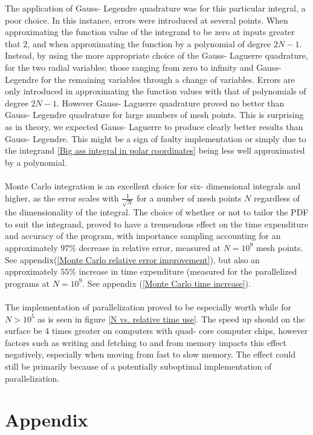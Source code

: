 \documentclass[10pt,a4paper]{article}
\begin{document}
The application of Gauss- Legendre quadrature was for this particular integral, a poor choice. In this instance, errors were introduced at several points. When approximating the function value of the integrand to be zero at inputs greater that 2, and when approximating the function by a polynomial of degree $2N-1$.\\Instead, by using the more appropriate choice of the Gauss- Laguerre quadrature, for the two radial variables; those ranging from zero to infinity and Gauss- Legendre for the remaining variables through a change of variables. Errors are only introduced in approximating the function values with that of polynomials of degree $2N-1$. However Gauss- Laguerre quadrature proved no better than Gauss- Legendre quadrature for large numbers of mesh points. This is surprising as in theory, we expected Gauss- Laguerre to produce clearly better results than Gauss- Legendre. This might be a sign of faulty implementation or simply due to the integrand \ref{Big ass integral in polar coordinates} being less well approximated by a polynomial.\\\\Monte Carlo integration is an excellent choice for six- dimensional integrals and higher, as the error scales with $\frac{1}{\sqrt{N}}$ for a number of mesh points $N$ regardless of the dimensionality of the integral. The choice of whether or not to tailor the PDF to suit the integrand, proved to have a tremendous effect on the time expenditure and accuracy of the program, with importance sampling accounting for an approximately  $97\%$ decrease in relative error, measured at $N = 10^9$ mesh points. See appendix(\ref{Monte Carlo relative error improvement}), but also an approximately $55\%$ increase in time expenditure (measured for the parallelized programs at $N = 10^9$. See appendix (\ref{Monte Carlo time increase}).\\\\The implementation of parallelization proved to be especially worth while for $N>10^5$ as is seen in figure \ref{N vs. relative time use}. The speed up should on the surface be 4 times greater on computers with quad- core computer chips, however factors such as writing and fetching to and from memory impacts this effect negatively, especially when moving from fast to slow memory. The effect could still be primarily because of a potentially suboptimal implementation of parallelization.
\section{Appendix}
\end{document}
